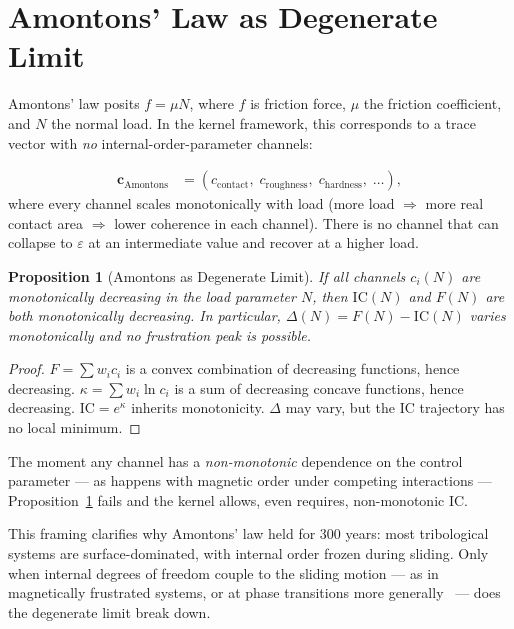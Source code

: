\documentclass[
  aps,
  prd,
  twocolumn,
  superscriptaddress,
  nofootinbib,
  floatfix
]{revtex4-2}
\newtheorem{proposition}[theorem]{Proposition}
\newcommand{\eps}{\varepsilon}
\newcommand{\tvec}{\mathbf{c}}
\newcommand{\IC}{\mathrm{IC}}
\begin{document}
\section{Amontons' Law as Degenerate Limit}\label{sec:amontons}

Amontons' law posits $f = \mu N$, where $f$ is friction
force, $\mu$ the friction coefficient, and $N$ the normal
load.  In the kernel framework, this corresponds to a
trace vector with \emph{no} internal-order-parameter channels:

\begin{align}
  \tvec_{\mathrm{Amontons}}
  &= (c_{\mathrm{contact}},\; c_{\mathrm{roughness}},\;
  c_{\mathrm{hardness}},\; \ldots),
  \label{eq:amont_trace}
\end{align}
where every channel scales monotonically with load
(more load $\Rightarrow$ more real contact area
$\Rightarrow$ lower coherence in each channel).
There is no channel that can collapse to $\eps$ at an
intermediate value and recover at a higher load.

\begin{proposition}[Amontons as Degenerate Limit]
\label{prop:amontons}
If all channels $c_i(N)$ are monotonically
decreasing in the load parameter $N$, then
$\IC(N)$ and $F(N)$ are both monotonically decreasing.
In particular, $\Delta(N) = F(N) - \IC(N)$ varies
monotonically and no frustration peak is possible.
\end{proposition}
\begin{proof}
$F = \sum w_i c_i$ is a convex combination of
decreasing functions, hence decreasing.
$\kappa = \sum w_i \ln c_i$ is a sum of decreasing
concave functions, hence decreasing. $\IC = e^\kappa$
inherits monotonicity.  $\Delta$ may vary, but the
$\IC$ trajectory has no local minimum.
\end{proof}

\noindent The moment any channel has a
\emph{non-monotonic} dependence on the control parameter
--- as happens with magnetic order under competing
interactions --- Proposition~\ref{prop:amontons}
fails and the kernel allows, even requires,
non-monotonic $\IC$.

This framing clarifies why Amontons' law held for 300
years: most tribological systems are surface-dominated,
with internal order frozen during sliding.  Only when
internal degrees of freedom couple to the sliding motion
--- as in magnetically frustrated systems, or at
phase transitions more generally~\cite{benassi2011,liu2022}
--- does the degenerate limit break down.
\end{document}
